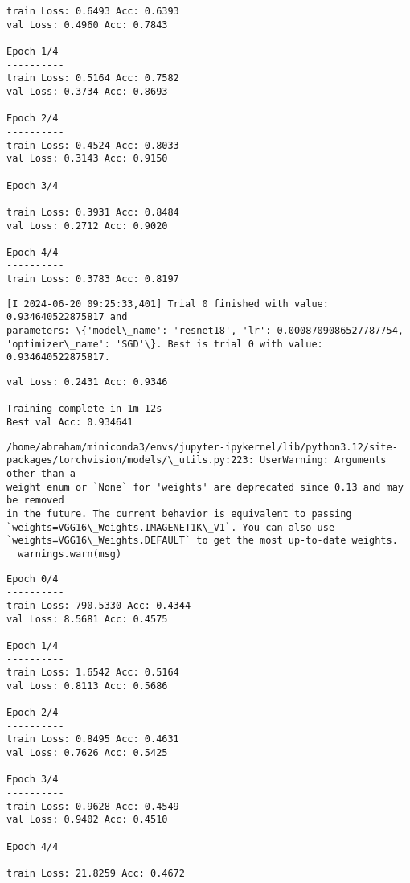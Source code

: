 \documentclass[11pt]{article}
\begin{document}
    \begin{Verbatim}[commandchars=\\\{\}]
train Loss: 0.6493 Acc: 0.6393
val Loss: 0.4960 Acc: 0.7843

Epoch 1/4
----------
train Loss: 0.5164 Acc: 0.7582
val Loss: 0.3734 Acc: 0.8693

Epoch 2/4
----------
train Loss: 0.4524 Acc: 0.8033
val Loss: 0.3143 Acc: 0.9150

Epoch 3/4
----------
train Loss: 0.3931 Acc: 0.8484
val Loss: 0.2712 Acc: 0.9020

Epoch 4/4
----------
train Loss: 0.3783 Acc: 0.8197
    \end{Verbatim}

    \begin{Verbatim}[commandchars=\\\{\}]
[I 2024-06-20 09:25:33,401] Trial 0 finished with value: 0.934640522875817 and
parameters: \{'model\_name': 'resnet18', 'lr': 0.0008709086527787754,
'optimizer\_name': 'SGD'\}. Best is trial 0 with value: 0.934640522875817.
    \end{Verbatim}

    \begin{Verbatim}[commandchars=\\\{\}]
val Loss: 0.2431 Acc: 0.9346

Training complete in 1m 12s
Best val Acc: 0.934641
    \end{Verbatim}

    \begin{Verbatim}[commandchars=\\\{\}]
/home/abraham/miniconda3/envs/jupyter-ipykernel/lib/python3.12/site-
packages/torchvision/models/\_utils.py:223: UserWarning: Arguments other than a
weight enum or `None` for 'weights' are deprecated since 0.13 and may be removed
in the future. The current behavior is equivalent to passing
`weights=VGG16\_Weights.IMAGENET1K\_V1`. You can also use
`weights=VGG16\_Weights.DEFAULT` to get the most up-to-date weights.
  warnings.warn(msg)
    \end{Verbatim}

    \begin{Verbatim}[commandchars=\\\{\}]
Epoch 0/4
----------
train Loss: 790.5330 Acc: 0.4344
val Loss: 8.5681 Acc: 0.4575

Epoch 1/4
----------
train Loss: 1.6542 Acc: 0.5164
val Loss: 0.8113 Acc: 0.5686

Epoch 2/4
----------
train Loss: 0.8495 Acc: 0.4631
val Loss: 0.7626 Acc: 0.5425

Epoch 3/4
----------
train Loss: 0.9628 Acc: 0.4549
val Loss: 0.9402 Acc: 0.4510

Epoch 4/4
----------
train Loss: 21.8259 Acc: 0.4672
    \end{Verbatim}
\end{document}
